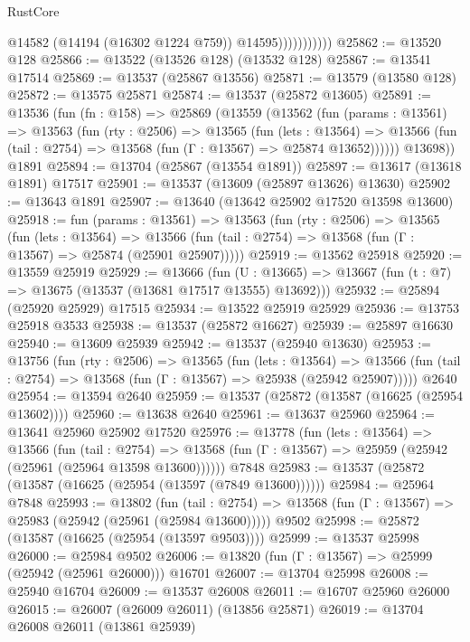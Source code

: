 \begin{lexlean}{RustCore}
\begin{coremodule}
                          @14582
                          (@14194 (@16302 @1224 @759))
                          @14595)))))))))))
@25862 := @13520 @128
@25866 := @13522 (@13526 @128) (@13532 @128)
@25867 := @13541 @17514
@25869 := @13537 (@25867 @13556)
@25871 := @13579 (@13580 @128)
@25872 := @13575 @25871
@25874 := @13537 (@25872 @13605)
@25891 := @13536
    (fun (fn : @158) =>
    @25869
      (@13559
        (@13562
          (fun (params : @13561) =>
          @13563
            (fun (rty : @2506) =>
            @13565
              (fun (lets : @13564) =>
              @13566 (fun (tail : @2754) => @13568 (fun (Γ : @13567) => @25874 @13652))))))
        @13698))
    @1891
@25894 := @13704 (@25867 (@13554 @1891))
@25897 := @13617 (@13618 @1891) @17517
@25901 := @13537 (@13609 (@25897 @13626) @13630)
@25902 := @13643 @1891
@25907 := @13640 (@13642 @25902 @17520 @13598 @13600)
@25918 := fun (params : @13561) =>
  @13563
    (fun (rty : @2506) =>
    @13565
      (fun (lets : @13564) =>
      @13566 (fun (tail : @2754) => @13568 (fun (Γ : @13567) => @25874 (@25901 @25907)))))
@25919 := @13562 @25918
@25920 := @13559 @25919
@25929 := @13666
    (fun (U : @13665) => @13667 (fun (t : @7) => @13675 (@13537 (@13681 @17517 @13555) @13692)))
@25932 := @25894 (@25920 @25929) @17515
@25934 := @13522 @25919 @25929
@25936 := @13753 @25918 @3533
@25938 := @13537 (@25872 @16627)
@25939 := @25897 @16630
@25940 := @13609 @25939
@25942 := @13537 (@25940 @13630)
@25953 := @13756
    (fun (rty : @2506) =>
    @13565
      (fun (lets : @13564) =>
      @13566 (fun (tail : @2754) => @13568 (fun (Γ : @13567) => @25938 (@25942 @25907)))))
    @2640
@25954 := @13594 @2640
@25959 := @13537 (@25872 (@13587 (@16625 (@25954 @13602))))
@25960 := @13638 @2640
@25961 := @13637 @25960
@25964 := @13641 @25960 @25902 @17520
@25976 := @13778
    (fun (lets : @13564) =>
    @13566
      (fun (tail : @2754) =>
      @13568 (fun (Γ : @13567) => @25959 (@25942 (@25961 (@25964 @13598 @13600))))))
    @7848
@25983 := @13537 (@25872 (@13587 (@16625 (@25954 (@13597 (@7849 @13600))))))
@25984 := @25964 @7848
@25993 := @13802
    (fun (tail : @2754) => @13568 (fun (Γ : @13567) => @25983 (@25942 (@25961 (@25984 @13600)))))
    @9502
@25998 := @25872 (@13587 (@16625 (@25954 (@13597 @9503))))
@25999 := @13537 @25998
@26000 := @25984 @9502
@26006 := @13820 (fun (Γ : @13567) => @25999 (@25942 (@25961 @26000))) @16701
@26007 := @13704 @25998
@26008 := @25940 @16704
@26009 := @13537 @26008
@26011 := @16707 @25960 @26000
@26015 := @26007 (@26009 @26011) (@13856 @25871)
@26019 := @13704 @26008 @26011 (@13861 @25939)

\end{coremodule}
\end{lexlean}
